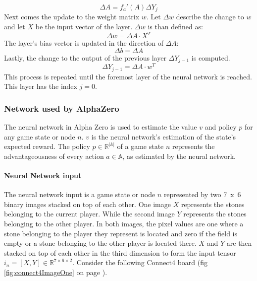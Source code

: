 \documentclass[12pt]{article}
\newcommand{\imgRef}[1]{(fig \ref{#1} on page \pageref{#1})}
\begin{document}
\begin{equation}\label{eq:NN:deltaA}
\Delta A = f_a'(A) \Delta Y_j
\end{equation}
Next comes the update to the weight matrix \(w\). Let \(\Delta w\) describe the change to \(w\) and let \(X\) be the input vector of the layer. \(\Delta w\) is than defined as:
\begin{equation}\label{eq:NN:deltaW}
\Delta w = \Delta A \cdot X^T
\end{equation}
The layer's bias vector is updated in the direction of \(\Delta A\):
\begin{equation}\label{eq:NN:deltaB}
\Delta b = \Delta A
\end{equation}
Lastly, the change to the output of the previous layer \(\Delta Y_{j-1}\) is computed.
\begin{equation} \label{eq:NN:deltaA_lastLayer}
\Delta Y_{j-1} = \Delta A \cdot w^T
\end{equation}
This process is repeated until the foremost layer of the neural network is reached. This layer has the index \(j=0\).

\subsubsection{Network used by AlphaZero}
The neural network in Alpha Zero is used to estimate the value \(v\) and policy \(p\) for any game state or node \(n\). \(v\) is the neural network's estimation of the state's expected reward. The policy \(p \in\mathbb{R}^{|\mathbb{A}|}\) of a game state \(n\) represents the advantageousness of every action \(a\in\mathbb{A}\), as estimated by the neural network.
\paragraph{Neural Network input}\label{sec:neuralNetworkInput}
The neural network input is a game state or node \(n\) represented by two \mbox{7 x 6} binary images stacked on top of each other. One image \(X\) represents the stones belonging to the current player. While the second image \(Y\) represents the stones belonging to the other player. In both images, the pixel values are one where a stone belonging to the player they represent is located and zero if the field is empty or a stone belonging to the other player is located there. \(X\) and \(Y\) are then stacked on top of each other in the third dimension to form the input tensor \(i_n = [X, Y] \in \mathbb{R}^{7 \times 6 \times 2}\).
Consider the following Connect4 board \imgRef{fig:connect4ImageOne}.
\end{document}
